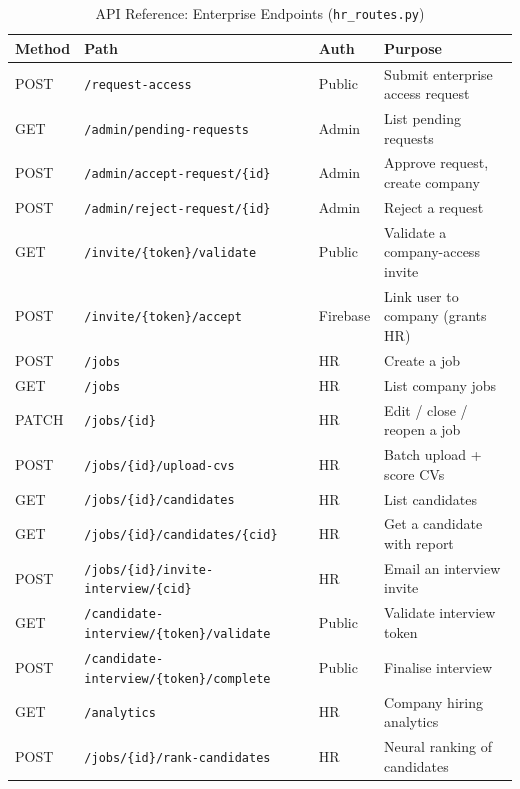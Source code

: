 \documentclass[12pt,a4paper,oneside]{report}
\begin{document}
\begin{table}[H]
\centering
\caption{API Reference: Enterprise Endpoints (\texttt{hr\_routes.py})}
\label{tab:api2}
\begin{tabularx}{\textwidth}{C{1.4cm}L{5.5cm}C{1.8cm}X}
\toprule
\textbf{Method} & \textbf{Path} & \textbf{Auth} & \textbf{Purpose} \\
\midrule
POST   & \texttt{/request-access}                  & Public   & Submit enterprise access request \\
GET    & \texttt{/admin/pending-requests}           & Admin    & List pending requests \\
POST   & \texttt{/admin/accept-request/\{id\}}      & Admin    & Approve request, create company \\
POST   & \texttt{/admin/reject-request/\{id\}}      & Admin    & Reject a request \\
GET    & \texttt{/invite/\{token\}/validate}         & Public   & Validate a company-access invite \\
POST   & \texttt{/invite/\{token\}/accept}           & Firebase & Link user to company (grants HR) \\
POST   & \texttt{/jobs}                              & HR       & Create a job \\
GET    & \texttt{/jobs}                              & HR       & List company jobs \\
PATCH  & \texttt{/jobs/\{id\}}                       & HR       & Edit / close / reopen a job \\
POST   & \texttt{/jobs/\{id\}/upload-cvs}            & HR       & Batch upload + score CVs \\
GET    & \texttt{/jobs/\{id\}/candidates}            & HR       & List candidates \\
GET    & \texttt{/jobs/\{id\}/candidates/\{cid\}}    & HR       & Get a candidate with report \\
POST   & \texttt{/jobs/\{id\}/invite-interview/\{cid\}} & HR   & Email an interview invite \\
GET    & \texttt{/candidate-interview/\{token\}/validate} & Public & Validate interview token \\
POST   & \texttt{/candidate-interview/\{token\}/complete} & Public & Finalise interview \\
GET    & \texttt{/analytics}                         & HR       & Company hiring analytics \\
POST   & \texttt{/jobs/\{id\}/rank-candidates}       & HR       & Neural ranking of candidates \\
\bottomrule
\end{tabularx}
\end{table}
\end{document}
